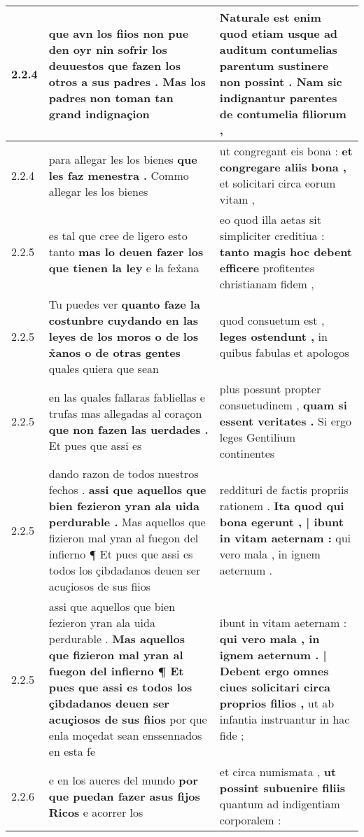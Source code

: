 \begin{tabular}{|p{1cm}|p{6.5cm}|p{6.5cm}|}
2.2.4 & que avn los fiios non pue den oyr \textbf{ nin sofrir los deuuestos que fazen los otros a sus padres . } Mas los padres non toman tan grand indignaçion & Naturale est enim quod etiam usque ad auditum \textbf{ contumelias parentum sustinere non possint . } Nam sic indignantur parentes de contumelia filiorum , \\\hline
2.2.4 & para allegar les los bienes \textbf{ que les faz menestra . } Commo allegar les los bienes & ut congregant eis bona : \textbf{ et congregare aliis bona , } et solicitari circa eorum vitam , \\\hline
2.2.5 & es tal que cree de ligero esto tanto \textbf{ mas lo deuen fazer los que tienen la ley } e la fex̉ana & eo quod illa aetas sit simpliciter creditiua : \textbf{ tanto magis hoc debent efficere } profitentes christianam fidem , \\\hline
2.2.5 & Tu puedes ver \textbf{ quanto faze la costunbre cuydando en las leyes de los moros o de los x̉anos o de otras gentes } quales quiera que sean & quod consuetum est , \textbf{ leges ostendunt , } in quibus fabulas et apologos \\\hline
2.2.5 & en las quales fallaras fabliellas e trufas mas allegadas al coraçon \textbf{ que non fazen las uerdades . } Et pues que assi es & plus possunt propter consuetudinem , \textbf{ quam si essent veritates . } Si ergo leges Gentilium continentes \\\hline
2.2.5 & dando razon de todos nuestros fechos . \textbf{ assi que aquellos que bien fezieron yran ala uida perdurable . } Mas aquellos que fizieron mal yran al fuegon del infierno ¶ Et pues que assi es todos los çibdadanos deuen ser acuçiosos de sus fiios & reddituri de factis propriis rationem . \textbf{ Ita quod qui bona egerunt , | ibunt in vitam aeternam : } qui vero mala , in ignem aeternum . \\\hline
2.2.5 & assi que aquellos que bien fezieron yran ala uida perdurable . \textbf{ Mas aquellos que fizieron mal yran al fuegon del infierno ¶ Et pues que assi es todos los çibdadanos deuen ser acuçiosos de sus fiios } por que enla moçedat sean enssennados en esta fe & ibunt in vitam aeternam : \textbf{ qui vero mala , in ignem aeternum . | Debent ergo omnes ciues solicitari circa proprios filios , } ut ab infantia instruantur in hac fide ; \\\hline
2.2.6 & e en los aueres del mundo \textbf{ por que puedan fazer asus fijos Ricos } e acorrer los & et circa numismata , \textbf{ ut possint subuenire filiis } quantum ad indigentiam corporalem : \\\hline

\end{tabular}
